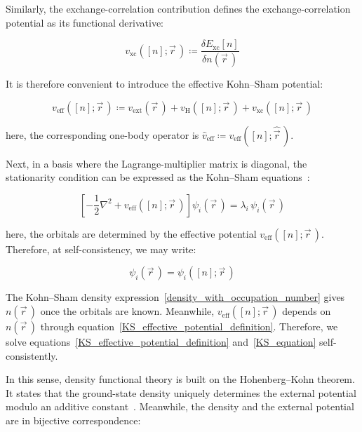 Similarly, the exchange-correlation contribution defines the exchange-correlation potential as its functional derivative:

\begin{equation}
    v_\mathrm{xc}([n];\vec{r}\,)\coloneqq\frac{\delta E_\mathrm{xc}[n]}{\delta n(\vec{r}\,)}
\label{xc_potential_definition}
\end{equation}

It is therefore convenient to introduce the effective Kohn--Sham potential:

\begin{equation}
    v_\mathrm{eff}([n];\vec{r}\,)
    \coloneqq v_\mathrm{ext}(\vec{r}\,)
    + v_\mathrm{H}([n];\vec{r}\,)
    + v_\mathrm{xc}([n];\vec{r}\,)
\label{KS_effective_potential_definition}
\end{equation}

here, the corresponding one-body operator is $\hat{v}_\mathrm{eff}\coloneqq v_\mathrm{eff}([n];\hat{\vec{r}}\,)$.

Next, in a basis where the Lagrange-multiplier matrix is diagonal,
the stationarity condition can be expressed as the Kohn--Sham equations~\cite{kohn1965self}:

\begin{equation}
    \left[-\frac{1}{2}\nabla^2+v_\mathrm{eff}([n];\vec{r}\,)\right]\psi_i(\vec{r}\,)
    = \lambda_i\,\psi_i(\vec{r}\,)
\label{KS_equation}
\end{equation}

here, the orbitals are determined by the effective potential $v_\mathrm{eff}([n];\vec{r}\,)$.
Therefore, at self-consistency, we may write:

\begin{equation}
    \psi_i(\vec{r}\,)=\psi_i([n];\vec{r}\,)
\label{KS_orbitals_as_density_functionals}
\end{equation}

The Kohn--Sham density expression~\eqref{density_with_occupation_number} gives $n(\vec{r}\,)$ once the orbitals are known.
Meanwhile, $v_\mathrm{eff}([n];\vec{r}\,)$ depends on $n(\vec{r}\,)$ through equation~\eqref{KS_effective_potential_definition}.
Therefore, we solve equations~\eqref{KS_effective_potential_definition} and~\eqref{KS_equation} self-consistently.

In this sense, density functional theory is built on the Hohenberg--Kohn theorem.
It states that the ground-state density uniquely determines the external potential modulo an additive constant~\cite{hohenberg1964inhomogeneous,kohn1999nobel}.
Meanwhile, the density and the external potential are in bijective correspondence:

